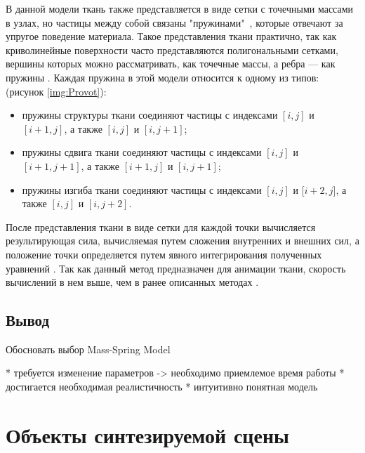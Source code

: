 \begin{itemize}[left=\parindent]
        В данной модели ткань также представляется в виде сетки с точечными
        массами в узлах, но частицы между собой связаны "пружинами"\ , которые
        отвечают за упругое поведение материала. Такое представления ткани
        практично, так как криволинейные поверхности часто представляются
        полигональными сетками, вершины которых можно рассматривать, как
        точечные массы, а ребра --- как пружины \cite{bib15}. Каждая пружина в
        этой модели относится к одному из типов: \cite{bib14} (рисунок
        \ref{img:Provot}):
        \begin{itemize}[left=\parindent]
            \item пружины структуры ткани соединяют частицы с индексами $[i,j]$
                и $[i+1,j]$, а также $[i,j]$ и $[i, j+1]$;
            \item пружины сдвига ткани соединяют частицы с индексами $[i,j]$ и
                $[i+1,j+1]$, а также $[i+1,j]$ и $[i, j+1]$;
            \item пружины изгиба ткани соединяют частицы с индексами $[i,j]$ и
                [$i+2,j]$, а также $[i,j]$ и $[i, j+2]$.
        \end{itemize}


        После представления ткани в виде сетки для каждой точки вычисляется
        результирующая сила, вычисляемая путем сложения внутренних и внешних
        сил, а положение точки определяется путем явного интегрирования
        полученных уравнений \cite{bib11}.  Так как данный метод предназначен
        для анимации ткани, скорость вычислений в нем выше, чем в ранее
        описанных методах \cite{bib14}.

\end{itemize}

\subsection*{Вывод}

Обосновать выбор Mass-Spring Model

* требуется изменение параметров -> необходимо приемлемое время работы
* достигается необходимая реалистичность
* интуитивно понятная модель

\section{Объекты синтезируемой сцены}

